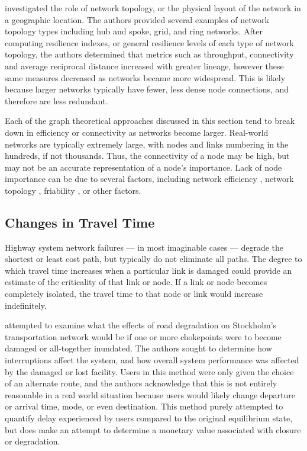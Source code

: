 \citet{zhang2015} investigated the role of network topology, or the physical
layout of the network in a geographic location.
The authors provided several examples of network topology types including
hub and spoke, grid, and
ring networks. After computing resilience indexes, or general resilience
levels of each type of
network topology, the authors determined that metrics such as throughput,
connectivity and average
reciprocal distance increased with greater lineage, however these same measures decreased as
networks became
more widespread. This is likely because larger networks typically have fewer, less dense node
connections, and
therefore are less redundant.

Each of the graph theoretical approaches discussed in this section tend to break
down in efficiency or connectivity as networks become larger. Real-world
networks are typically extremely large, with nodes and links numbering in the
hundreds, if not thousands. Thus, the connectivity of a node may be high, but may
not be an accurate representation of a node's importance. Lack of node importance
can be due to several factors, including network efficiency \citet{osei2014}, network topology \citet{zhang2015},
friability \citet{ip2011}, or other factors.

\subsection{Changes in Travel Time}

Highway system network failures --- in most imaginable cases --- degrade
the
shortest or least cost path, but typically do not eliminate all paths.
The degree
to which travel time increases when a particular link is damaged could
provide an estimate of the criticality of that link or node. If a link or node
becomes completely isolated, the travel time to that node or link would
increase indefinitely.

\citet{Berdica2007} attempted to examine what the effects of road
degradation on Stockholm's transportation network would be if one or more
chokepoints were to become damaged or all-together inundated. The authors
sought to determine how interruptions affect the system, and how overall
system performance was affected by the damaged or lost facility. Users in this method were only given the
choice of an alternate route, and the authors acknowledge that this is not
entirely reasonable in a real world situation because users would likely change
departure or arrival time, mode, or even destination. This method purely attempted
to quantify delay experienced by users compared to the original
equilibrium state, but does make an attempt to determine a monetary value
associated with closure or degradation.

